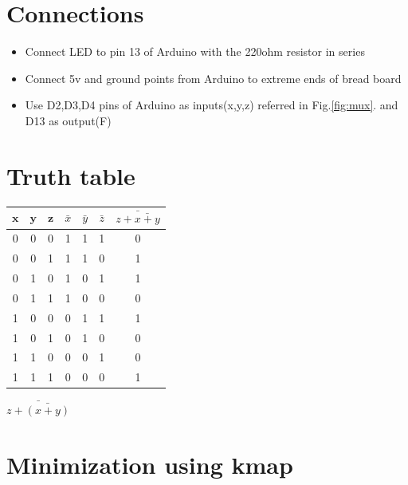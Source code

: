 \section{Connections}
\begin{itemize}

\item Connect LED to pin 13 of Arduino with the 220ohm resistor in series
\item Connect 5v and ground points from Arduino to extreme ends of bread board
\item Use D2,D3,D4 pins of Arduino as inputs(x,y,z) referred in Fig.\ref{fig:mux}.  and D13 as output(F)
\end{itemize}
\section{\large Truth table}
{
\centering
\begin{tabular}{|c|c|c|c|c|c|c|}
\hline
$\boldsymbol{x}$&$\boldsymbol{y}$&$\boldsymbol{z}$&$\bar{x}$&$\bar{y}$&$\bar{z}$&$\bar{z+ \bar{x+y}}$\\
\hline
0&0&0&1&1&1&0\\
\hline
0&0&1&1&1&0&1\\
\hline
0&1&0&1&0&1&1\\
\hline
0&1&1&1&0&0&0\\
\hline
1&0&0&0&1&1&1\\
\hline
1&0&1&0&1&0&0\\
\hline
1&1&0&0&0&1&0\\
\hline
1&1&1&0&0&0&1\\
\hline
\end{tabular}
}
$\bar{z+ \bar{(x+y)}}$
\section*{\large Minimization using kmap}
\begin{kvmap}
\end{kvmap}
